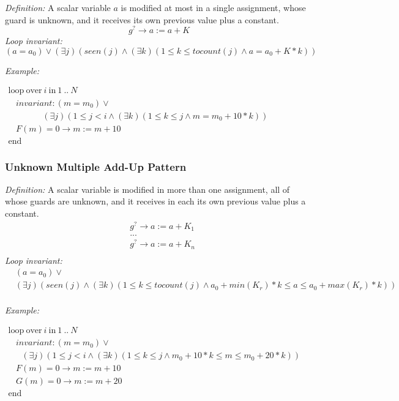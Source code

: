 \documentclass[a4paper,10pt]{article}
\newcommand{\KWloop}{\ensuremath{\mathrm{loop}~}}
\newcommand{\KWend}{\ensuremath{\mathrm{end}~}}
\newcommand{\KWover}{\ensuremath{\mathrm{over}~}}
\newcommand{\KWin}{\ensuremath{~\mathrm{in}~}}
\newcommand{\seen}[1]{\ensuremath{\mathit{seen}(#1)}\xspace}
\newcommand{\tocount}[1]{\ensuremath{\mathit{tocount}(#1)}\xspace}
\newcommand{\loopinvariant}{\noindent\textit{Loop invariant:}\xspace}
\newcommand{\patterndef}{\noindent\textit{Definition:}\xspace}
\newcommand{\patternexample}{\noindent\textit{Example:}\xspace}
\begin{document}
\patterndef A scalar variable $a$ is modified at most in a single assignment, whose
guard is unknown, and it receives its own previous value plus a constant.
%
$$g^? \rightarrow a := a + K$$
%
\loopinvariant
%
$$(a = a_0) \lor (\exists j)(\seen{j} \land (\exists k)(1 \leq k \leq \tocount{j} \land a = a_0 + K * k))$$

\bigskip
\patternexample

\medskip
$\begin{array}{l}
  \KWloop \KWover i \KWin 1~..~N \\
  ~~~~ \textit{invariant}: (m = m_0) \lor \\
  ~~~~~~~~~~~~~~~~~~ (\exists j)(1 \leq j < i \land (\exists k)(1 \leq k \leq j \land m = m_0+10*k))\\
  ~~~~ F(m)=0 \rightarrow m := m+10\\
  \KWend
\end{array}$

\subsubsection*{Unknown Multiple Add-Up Pattern}

\patterndef A scalar variable is modified in more than one assignment, all of
whose guards are unknown, and it receives in each its own previous value
plus a constant.
%
\begin{eqnarray*}
&g^? \rightarrow a := a + K_1\\
&...\\
&g^? \rightarrow a := a + K_n\\
\end{eqnarray*}
%
\loopinvariant
%
\begin{eqnarray*}
&(a = a_0) \lor\\
&(\exists j)(\seen{j} \land (\exists k)(1 \leq k \leq \tocount{j} \land a_0 + \mathit{min}(K_r)*k \leq a \leq a_0 + \mathit{max}(K_r)*k))\\
\end{eqnarray*}

\bigskip
\patternexample

\medskip
$\begin{array}{l}
  \KWloop \KWover i \KWin 1~..~N \\
  ~~~~ \textit{invariant}: (m = m_0) \lor \\
  ~~~~~~~ (\exists j)(1 \leq j < i \land (\exists k)(1 \leq k \leq j \land m_0+10*k \leq m \leq m_0 +20*k))\\
  ~~~~ F(m)=0 \rightarrow m := m+10\\
  ~~~~ G(m)=0 \rightarrow m := m+20\\
  \KWend
\end{array}$
\end{document}
